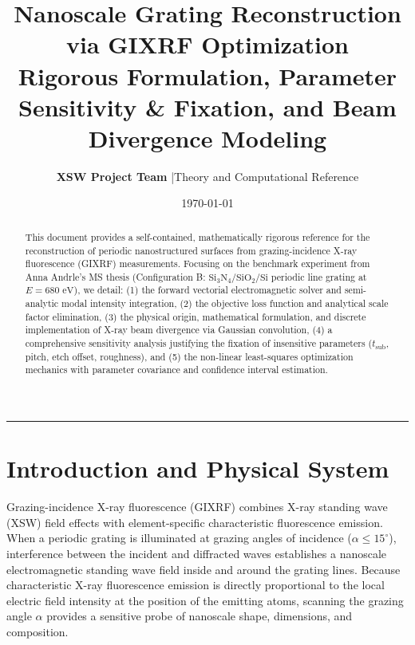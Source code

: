 \documentclass[11pt,a4paper]{article}
\title{\textbf{\LARGE Nanoscale Grating Reconstruction via GIXRF Optimization}\\[6pt]
\large Rigorous Formulation, Parameter Sensitivity \& Fixation, and Beam Divergence Modeling}
\author{\textbf{XSW Project Team} \quad|\quad Theory and Computational Reference}
\date{\today}
\begin{document}
\maketitle

\begin{abstract}
\noindent This document provides a self-contained, mathematically rigorous reference for the reconstruction of periodic nanostructured surfaces from grazing-incidence X-ray fluorescence (GIXRF) measurements. Focusing on the benchmark experiment from Anna Andrle's MS thesis (Configuration B: $\mathrm{Si}_3\mathrm{N}_4/\mathrm{SiO}_2/\mathrm{Si}$ periodic line grating at $E = 680\text{ eV}$), we detail: (1) the forward vectorial electromagnetic solver and semi-analytic modal intensity integration, (2) the objective loss function and analytical scale factor elimination, (3) the physical origin, mathematical formulation, and discrete implementation of X-ray beam divergence via Gaussian convolution, (4) a comprehensive sensitivity analysis justifying the fixation of insensitive parameters ($t_{\mathrm{sub}}$, pitch, etch offset, roughness), and (5) the non-linear least-squares optimization mechanics with parameter covariance and confidence interval estimation.
\end{abstract}

\hrule
\vspace{4pt}

\section{Introduction and Physical System}

Grazing-incidence X-ray fluorescence (GIXRF) combines X-ray standing wave (XSW) field effects with element-specific characteristic fluorescence emission. When a periodic grating is illuminated at grazing angles of incidence ($\alpha \le 15^\circ$), interference between the incident and diffracted waves establishes a nanoscale electromagnetic standing wave field inside and around the grating lines. Because characteristic X-ray fluorescence emission is directly proportional to the local electric field intensity at the position of the emitting atoms, scanning the grazing angle $\alpha$ provides a sensitive probe of nanoscale shape, dimensions, and composition.
\end{document}
